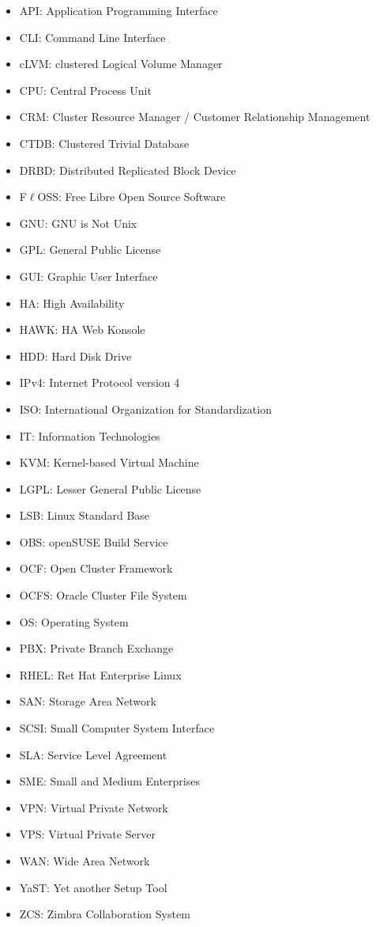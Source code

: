 \documentclass[a4paper, 12pt]{book}
\begin{document}
\begin{itemize}[label={}]
	\item API: Application Programming Interface
	\item CLI: Command Line Interface
	\item cLVM: clustered Logical Volume Manager
	\item CPU: Central Process Unit
	\item CRM: Cluster Resource Manager / Customer Relationship Management
	\item CTDB: Clustered Trivial Database
	\item DRBD: Distributed Replicated Block Device
	\item F$\ell$OSS: Free Libre Open Source Software
	\item GNU: GNU is Not Unix
	\item GPL:  General Public License
	\item GUI: Graphic User Interface
	\item HA: High Availability
	\item HAWK: HA Web Konsole
	\item HDD: Hard Disk Drive
	\item IPv4: Internet Protocol version 4
	\item ISO: International Organization for Standardization
	\item IT: Information Technologies
	\item KVM: Kernel-based Virtual Machine
	\item LGPL: Lesser General Public License
	\item LSB: Linux Standard Base
	\item OBS: openSUSE Build Service
	\item OCF: Open Cluster Framework
	\item OCFS: Oracle Cluster File System
	\item OS: Operating System
	\item PBX: Private Branch Exchange
	\item RHEL: Ret Hat Enterprise Linux
	\item SAN: Storage Area Network
	\item SCSI: Small Computer System Interface
	\item SLA: Service Level Agreement
	\item SME: Small and Medium Enterprises
	\item VPN: Virtual Private Network
	\item VPS: Virtual Private Server
	\item WAN: Wide Area Network
	\item YaST: Yet another Setup Tool
	\item ZCS: Zimbra Collaboration System
\end{itemize}
\end{document}
